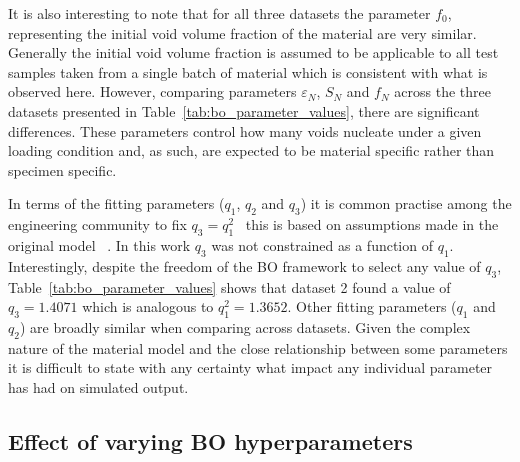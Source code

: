 \documentclass[preprint, review, 12pt]{elsarticle}
\begin{document}
	It is also interesting to note that for all three datasets the parameter $f_0$, representing the initial void volume fraction of the material are very similar.
	Generally the initial void volume fraction is assumed to be applicable to all test samples taken from a single batch of material which is consistent with what is observed here.
	However, comparing parameters $\varepsilon_N$, $S_N$ and $f_N$ across the three datasets presented in Table~\ref{tab:bo_parameter_values}, there are significant differences.
	These parameters control how many voids nucleate under a given loading condition and, as such, are expected to be material specific rather than specimen specific.

	In terms of the fitting parameters ($q_1$, $q_2$ and $q_3$) it is common practise among the engineering community to fix $q_3 = q_1^2$~\cite{ABBASI2011,ROUSSELIER2019, YAN2021} this is based on assumptions made in the original model ~\cite{TVERGAARD1981a}.
	In this work $q_3$ was not constrained as a function of $q_1$.
	Interestingly, despite the freedom of the BO framework to select any value of $q_3$, Table~\ref{tab:bo_parameter_values} shows that dataset 2 found a value of $q_3=1.4071$ which is analogous to $q_1^2=1.3652$.
	Other fitting parameters ($q_1$ and $q_2$) are broadly similar when comparing across datasets.
	Given the complex nature of the material model and the close relationship between some parameters it is difficult to state with any certainty what impact any individual parameter has had on simulated output.

	\subsection{Effect of varying BO hyperparameters}
	\label{h:unique}
\end{document}
